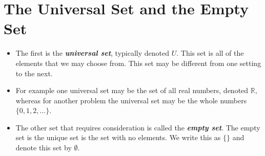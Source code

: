 \section*{The Universal Set and the Empty Set}
\begin{itemize}
\item The first is the \textbf{\textit{universal set}}, typically denoted $U$. This set is all of the elements that we may choose from. This set may be different from one setting to the next. 

\item For example one universal set may be the set of all real numbers, denoted $\mathbb{R}$, whereas for another problem the universal set may be the whole numbers $\{0, 1, 2,\ldots\}$.

\item The other set that requires consideration is called the \textit{\textbf{empty set}}. The empty set is the unique set is the set with no elements. We write this as $\{ \}$ and denote this set by $\emptyset$.
\end{itemize}

